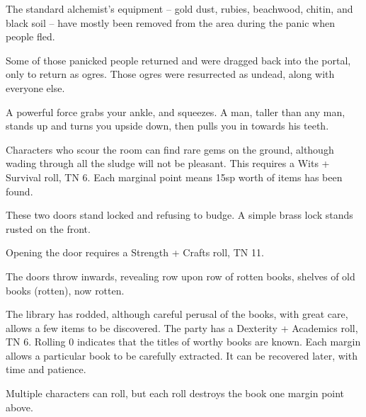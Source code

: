 \begin{multicols}{2}
The standard alchemist's equipment -- gold dust, rubies, beachwood, chitin, and black soil -- have mostly been removed from the area during the panic when people fled.

Some of those panicked people returned and were dragged back into the portal, only to return as ogres.  Those ogres were resurrected as undead, along with everyone else.

\begin{boxtext}
	A powerful force grabs your ankle, and squeezes.  A man, taller than any man, stands up and turns you upside down, then pulls you in towards his teeth.
\end{boxtext}

Characters who scour the room can find rare gems on the ground, although wading through all the sludge will not be pleasant.  This requires a Wits + Survival roll, TN 6.  Each marginal point means 15sp worth of items has been found.




\begin{boxtext}
	These two doors stand locked and refusing to budge.  A simple brass lock stands rusted on the front.
\end{boxtext}

Opening the door requires a Strength + Crafts roll, TN 11.

\begin{boxtext}
	The doors throw inwards, revealing row upon row of rotten books, shelves of old books (rotten), now rotten.
\end{boxtext}

The library has rodded, although careful perusal of the books, with great care, allows a few items to be discovered.  The party has a Dexterity + Academics roll, TN 6.  Rolling 0 indicates that the titles of worthy books are known.  Each margin allows a particular book to be carefully extracted.  It can be recovered later, with time and patience.

Multiple characters can roll, but each roll destroys the book one margin point above.

\begin{enumerate}


\end{enumerate}
\end{multicols}
